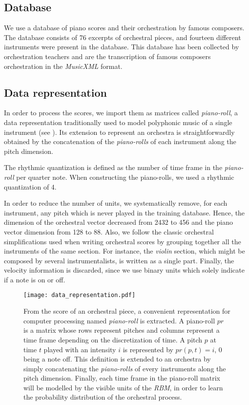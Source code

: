 \documentclass{amsart}
\begin{document}
	\subsection{Database}
	We use a database of piano scores and their orchestration by famous composers. The database consists of 76 excerpts of orchestral pieces, and fourteen different instruments were present in the database. This database has been collected by orchestration teachers and are the transcription of famous composers orchestration in the \textit{MusicXML} format.
	
	\subsection{Data representation}
	In order to process the scores, we import them as matrices called \textit{piano-roll}, a data representation traditionally used to model polyphonic music of a single instrument (see ). 
	Its extension to represent an orchestra is straightforwardly obtained by the concatenation of the \textit{piano-rolls} of each instrument along the pitch dimension.
	
	The rhythmic quantization is defined as the number of time frame in the \textit{piano-roll} per quarter note. When constructing the piano-rolls, we used a rhythmic quantization of 4.
	
	In order to reduce the number of units, we systematically remove, for each instrument, any pitch which is never played in the training database. Hence, the dimension of the orchestral vector decreased from 2432 to 456 and the piano vector dimension from 128 to 88.
	Also, we follow the classic orchestral simplifications used when writing orchestral scores by grouping together all the instruments of the same section. For instance, the \textit{violin} section, which might be composed by several instrumentalists, is written as a single part.
	Finally, the velocity information is discarded, since we use binary units which solely indicate if a note is on or off.
	
	\begin{figure}[ht]
		\centering
		\texttt{[image: data\_representation.pdf]}
		\caption{From the score of an orchestral piece, a convenient representation for computer processing named \textit{piano-roll} is extracted. A piano-roll $pr$ is a matrix whose rows represent pitches and columns represent a time frame depending on the discretization of time. A pitch $p$ at time $t$ played with an intensity $i$ is represented by $pr(p,t) = i$, $0$ being a note off. This definition is extended to an orchestra by simply concatenating the \textit{piano-rolls} of every instruments along the pitch dimension.
			Finally, each time frame in the piano-roll matrix will be modelled by the visible units of the \textit{RBM}, in order to learn the probability distribution of the orchestral process.}
		\label{fig:piano-roll}
	\end{figure}
	
\end{document}
